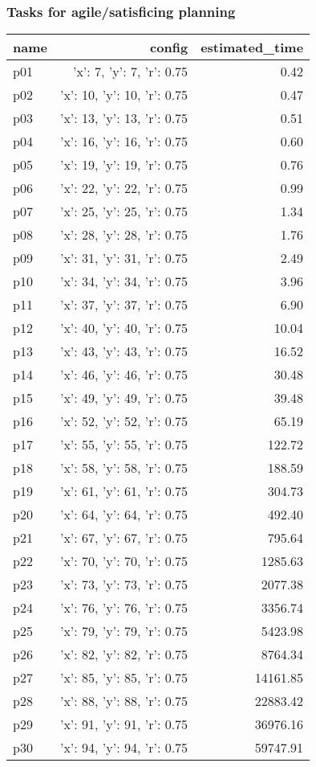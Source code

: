 \documentclass{article}
\begin{document}
                                \subsubsection*{Tasks for agile/satisficing planning}
                                
                            \begin{center}
                            \scriptsize
                            \begin{tabular}{@{}l|r|r@{}}
                            name & config & estimated\_time\\\midrule
                              p01&{'x': 7, 'y': 7, 'r': 0.75}&0.42\\
  p02&{'x': 10, 'y': 10, 'r': 0.75}&0.47\\
  p03&{'x': 13, 'y': 13, 'r': 0.75}&0.51\\
  p04&{'x': 16, 'y': 16, 'r': 0.75}&0.60\\
  p05&{'x': 19, 'y': 19, 'r': 0.75}&0.76\\
  p06&{'x': 22, 'y': 22, 'r': 0.75}&0.99\\
  p07&{'x': 25, 'y': 25, 'r': 0.75}&1.34\\
  p08&{'x': 28, 'y': 28, 'r': 0.75}&1.76\\
  p09&{'x': 31, 'y': 31, 'r': 0.75}&2.49\\
  p10&{'x': 34, 'y': 34, 'r': 0.75}&3.96\\
  p11&{'x': 37, 'y': 37, 'r': 0.75}&6.90\\
  p12&{'x': 40, 'y': 40, 'r': 0.75}&10.04\\
  p13&{'x': 43, 'y': 43, 'r': 0.75}&16.52\\
  p14&{'x': 46, 'y': 46, 'r': 0.75}&30.48\\
  p15&{'x': 49, 'y': 49, 'r': 0.75}&39.48\\
  p16&{'x': 52, 'y': 52, 'r': 0.75}&65.19\\
  p17&{'x': 55, 'y': 55, 'r': 0.75}&122.72\\
  p18&{'x': 58, 'y': 58, 'r': 0.75}&188.59\\
  p19&{'x': 61, 'y': 61, 'r': 0.75}&304.73\\
  p20&{'x': 64, 'y': 64, 'r': 0.75}&492.40\\
  p21&{'x': 67, 'y': 67, 'r': 0.75}&795.64\\
  p22&{'x': 70, 'y': 70, 'r': 0.75}&1285.63\\
  p23&{'x': 73, 'y': 73, 'r': 0.75}&2077.38\\
  p24&{'x': 76, 'y': 76, 'r': 0.75}&3356.74\\
  p25&{'x': 79, 'y': 79, 'r': 0.75}&5423.98\\
  p26&{'x': 82, 'y': 82, 'r': 0.75}&8764.34\\
  p27&{'x': 85, 'y': 85, 'r': 0.75}&14161.85\\
  p28&{'x': 88, 'y': 88, 'r': 0.75}&22883.42\\
  p29&{'x': 91, 'y': 91, 'r': 0.75}&36976.16\\
  p30&{'x': 94, 'y': 94, 'r': 0.75}&59747.91
                            \end{tabular}
                            \end{center}
                    
\end{document}
